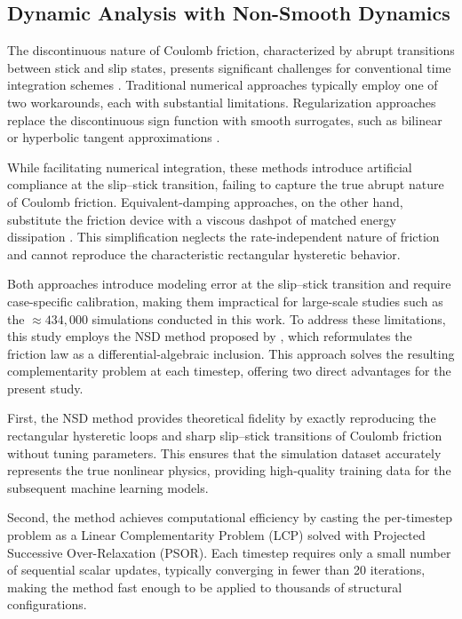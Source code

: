 \documentclass[preprint,12pt,authoryear]{elsarticle}
\begin{document}
\subsection{Dynamic Analysis with Non-Smooth Dynamics}
\label{sec:theory:nsd}

The discontinuous nature of Coulomb friction, characterized by abrupt transitions between stick and slip states, presents significant challenges for conventional time integration schemes \citep{chopra_dynamics_2015}. Traditional numerical approaches typically employ one of two workarounds, each with substantial limitations. Regularization approaches replace the discontinuous sign function with smooth surrogates, such as bilinear or hyperbolic tangent approximations \citep{lee_seismic_2025}. 

While facilitating numerical integration, these methods introduce artificial compliance at the slip--stick transition, failing to capture the true abrupt nature of Coulomb friction. Equivalent-damping approaches, on the other hand, substitute the friction device with a viscous dashpot of matched energy dissipation \citep{Jarrahi2020jbe}. This simplification neglects the rate-independent nature of friction and cannot reproduce the characteristic rectangular hysteretic behavior.

Both approaches introduce modeling error at the slip--stick transition and require case-specific calibration, making them impractical for large-scale studies such as the ${\approx}434{,}000$ simulations conducted in this work. To address these limitations, this study employs the NSD method proposed by \citet{Namorado2022}, which reformulates the friction law as a differential-algebraic inclusion. This approach solves the resulting complementarity problem at each timestep, offering two direct advantages for the present study.

First, the NSD method provides theoretical fidelity by exactly reproducing the rectangular hysteretic loops and sharp slip--stick transitions of Coulomb friction without tuning parameters. This ensures that the simulation dataset accurately represents the true nonlinear physics, providing high-quality training data for the subsequent machine learning models. 

Second, the method achieves computational efficiency by casting the per-timestep problem as a Linear Complementarity Problem (LCP) solved with Projected Successive Over-Relaxation (PSOR). Each timestep requires only a small number of sequential scalar updates, typically converging in fewer than 20 iterations, making the method fast enough to be applied to thousands of structural configurations.
\end{document}

